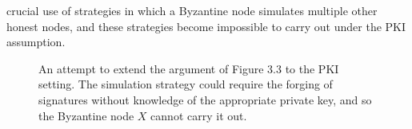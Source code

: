 crucial use of strategies in which a Byzantine node simulates multiple other honest nodes,
and these strategies become impossible to carry out under the PKI assumption.
\begin{figure}[h]
    \centering
    \qquad
    \caption{ An attempt to extend the argument of Figure 3.3 to the PKI setting. The simulation
    strategy could require the forging of signatures without knowledge of the appropriate private
    key, and so the Byzantine node $X$ cannot carry it out.
        }
    \label{fig:example}%
\end{figure}



